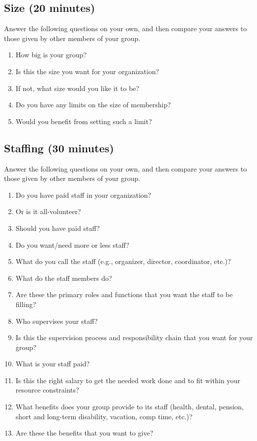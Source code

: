 \documentclass[10pt,statementpaper]{memoir}
\providecommand{\tightlist}{%
  \setlength{\itemsep}{0pt}\setlength{\parskip}{0pt}}
\begin{document}
\subsection{Size (20 minutes)}\label{size-20-minutes}

Answer the following questions on your own, and then compare your
answers to those given by other members of your group.

\begin{enumerate}
\def\labelenumi{\arabic{enumi}.}
\tightlist
\item
  How big is your group?
\item
  Is this the size you want for your organization?
\item
  If not, what size would you like it to be?
\item
  Do you have any limits on the size of membership?
\item
  Would you benefit from setting such a limit?
\end{enumerate}

\subsection{Staffing (30 minutes)}\label{staffing-30-minutes}

Answer the following questions on your own, and then compare your
answers to those given by other members of your group.

\begin{enumerate}
\def\labelenumi{\arabic{enumi}.}
\tightlist
\item
  Do you have paid staff in your organization?
\item
  Or is it all-volunteer?
\item
  Should you have paid staff?
\item
  Do you want/need more or less staff?
\item
  What do you call the staff (e.g., organizer, director, coordinator,
  etc.)?
\item
  What do the staff members do?
\item
  Are these the primary roles and functions that you want the staff to
  be filling?
\item
  Who supervises your staff?
\item
  Is this the supervision process and responsibility chain that you want
  for your group?
\item
  What is your staff paid?
\item
  Is this the right salary to get the needed work done and to fit within
  your resource constraints?
\item
  What benefits does your group provide to its staff (health, dental,
  pension, short and long-term disability, vacation, comp time, etc.)?
\item
  Are these the benefits that you want to give?
\end{enumerate}
\end{document}
